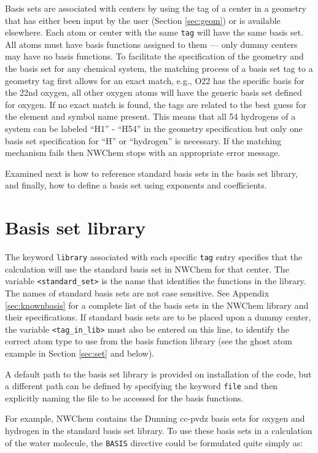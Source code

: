 Basis sets are associated with centers by using the tag of a center in
a geometry that has either been input by the user (Section
\ref{sec:geom}) or is available elsewhere.  Each atom or center with
the same \verb+tag+ will have the same basis set.  All atoms must have
basis functions assigned to them --- only dummy centers may have no
basis functions.  To facilitate the specification of the geometry and
the basis set for any chemical system, the matching process of a basis
set tag to a geometry tag first allows for an exact match, e.g., O22
has the specific basis for the 22nd oxygen, all other oxygen atoms
will have the generic basis set defined for oxygen.  If no exact match
is found, the tags are related to the best guess for the element and
symbol name present.  This means that all 54 hydrogens of a system can
be labeled ``H1'' - ``H54'' in the geometry specification but only one
basis set specification for ``H'' or ``hydrogen'' is necessary.  If
the matching mechanism fails then NWChem stops with an appropriate
error message.

Examined next is how to reference standard basis sets in the basis set
library, and finally, how to define a basis set using exponents and
coefficients.

\section{Basis set library}

The keyword \verb+library+ associated with each specific \verb+tag+
entry specifies that the calculation will use the standard basis set
in NWChem for that center.  The variable \verb+<standard_set>+ is the
name that identifies the functions in the library.  The names of
standard basis sets are not case sensitive.  See Appendix
\ref{sec:knownbasis} for a complete list of the basis sets in the
NWChem library and their specifications.  If standard basis sets are
to be placed upon a dummy center, the variable \verb+<tag_in_lib>+
must also be entered on this line, to identify the correct atom type
to use from the basis function library (see the ghost atom example in
Section \ref{sec:set} and below).

A default path to the basis set library is provided on installation of
the code, but a different path can be defined by specifying the
keyword \verb+file+ and then explicitly naming the file to be accessed
for the basis functions.

For example, NWChem contains the Dunning cc-pvdz basis sets for
oxygen and hydrogen in the standard basis set library.
To use these basis sets in a calculation of the water molecule,
the \verb+BASIS+ directive
could be formulated quite simply as:

